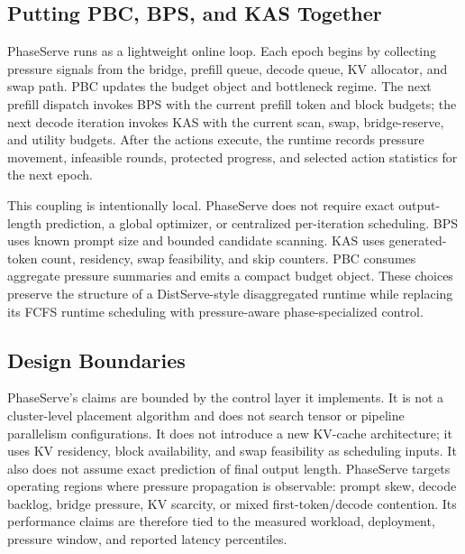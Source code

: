 \documentclass[lettersize,journal]{IEEEtran}
\begin{document}
\subsection{Putting PBC, BPS, and KAS Together}

PhaseServe runs as a lightweight online loop. Each epoch begins by collecting pressure signals from the bridge, prefill queue, decode queue, KV allocator, and swap path. PBC updates the budget object and bottleneck regime. The next prefill dispatch invokes BPS with the current prefill token and block budgets; the next decode iteration invokes KAS with the current scan, swap, bridge-reserve, and utility budgets. After the actions execute, the runtime records pressure movement, infeasible rounds, protected progress, and selected action statistics for the next epoch.

This coupling is intentionally local. PhaseServe does not require exact output-length prediction, a global optimizer, or centralized per-iteration scheduling. BPS uses known prompt size and bounded candidate scanning. KAS uses generated-token count, residency, swap feasibility, and skip counters. PBC consumes aggregate pressure summaries and emits a compact budget object. These choices preserve the structure of a DistServe-style disaggregated runtime while replacing its FCFS runtime scheduling with pressure-aware phase-specialized control.

\subsection{Design Boundaries}

PhaseServe's claims are bounded by the control layer it implements. It is not a cluster-level placement algorithm and does not search tensor or pipeline parallelism configurations. It does not introduce a new KV-cache architecture; it uses KV residency, block availability, and swap feasibility as scheduling inputs. It also does not assume exact prediction of final output length. PhaseServe targets operating regions where pressure propagation is observable: prompt skew, decode backlog, bridge pressure, KV scarcity, or mixed first-token/decode contention. Its performance claims are therefore tied to the measured workload, deployment, pressure window, and reported latency percentiles.
\end{document}
